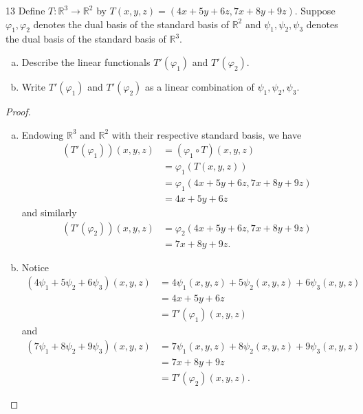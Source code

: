 \documentclass[11pt]{extarticle}
\newenvironment{problem}[1]{\begin{prob*}{#1}{}}{\end{prob*}}
\newcommand{\R}{\mathbb{R}}
\begin{document}
\begin{problem}{13}
Define $T:\R^3\to\R^2$ by $T(x,y,z) = (4x + 5y + 6z, 7x + 8y + 9z)$.  Suppose $\varphi_1,\varphi_2$ denotes the dual basis of the standard basis of $\R^2$ and $\psi_1,\psi_2,\psi_3$ denotes the dual basis of the standard basis of $\R^3$.  
\begin{enumerate}[(a)]
\item Describe the linear functionals $T'(\varphi_1)$ and $T'(\varphi_2)$.
\item Write $T'(\varphi_1)$ and $T'(\varphi_2)$ as a linear combination of $\psi_1,\psi_2,\psi_3$.  
\end{enumerate}
\end{problem}
\begin{proof}
\begin{enumerate}[(a)]
\item Endowing $\R^3$ and $\R^2$ with their respective standard basis, we have
\begin{align*}
(T'(\varphi_1))(x, y, z) &= (\varphi_1\circ T)(x, y, z)\\
&= \varphi_1(T(x, y, z))\\
&= \varphi_1(4x + 5y + 6z, 7x + 8y + 9z)\\
&= 4x + 5y + 6z
\end{align*}
and similarly
\begin{align*}
(T'(\varphi_2))(x, y, z) &= \varphi_2(4x + 5y + 6z, 7x + 8y + 9z)\\
&= 7x + 8y + 9z.
\end{align*}
\item Notice
\begin{align*}
(4\psi_1 + 5\psi_2 + 6\psi_3)(x, y, z) &= 4\psi_1(x,y,z) + 5\psi_2(x,y,z) + 6\psi_3(x,y,z) \\
&= 4x + 5y + 6z\\
&= T'(\varphi_1)(x, y, z)
\end{align*}
and 
\begin{align*}
(7\psi_1 + 8\psi_2 + 9\psi_3)(x, y, z) &= 7\psi_1(x,y,z) + 8\psi_2(x,y,z) + 9\psi_3(x,y,z) \\
&= 7x + 8y + 9z\\
&= T'(\varphi_2)(x, y, z).
\end{align*}
\end{enumerate}
\end{proof}
\end{document}
